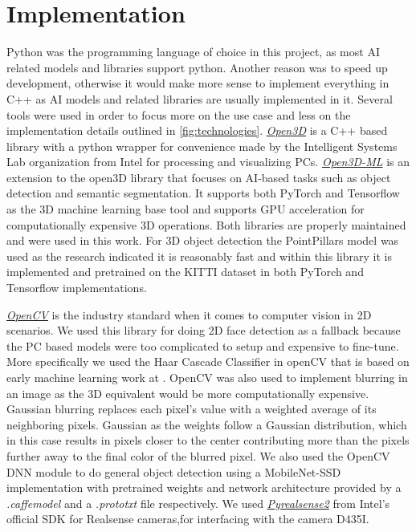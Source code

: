 \section{Implementation}
\label{sec:system:sec2}
Python was the programming language of choice in this project, as most AI related models and libraries
support python. Another reason was to speed up development, otherwise it would make more
sense to implement everything in C++ as AI models and related libraries are usually implemented in it.
Several tools were used in order to focus more on the use case and less on the implementation
details outlined in \ref{fig:technologies}.
\href{https://github.com/isl-org/Open3D}{\emph{Open3D}} is a C++ based library with a python wrapper for convenience made by the Intelligent Systems Lab organization from Intel for processing and visualizing \ac{PC}s.
\href{https://github.com/isl-org/Open3D-ML/}{\emph{Open3D-ML}} is an extension to the open3D library that focuses on AI-based tasks such as object detection and semantic segmentation.
It supports both PyTorch and Tensorflow as the 3D machine learning base tool and supports GPU acceleration for computationally expensive 3D operations.
Both libraries are properly maintained and were used in this work.
For 3D object detection the PointPillars model was used as the research indicated it is reasonably fast and within this library it is implemented and pretrained on the KITTI dataset in both PyTorch and Tensorflow implementations.

\href{https://opencv.org/}{\emph{OpenCV}} is the industry standard when it comes to computer vision in 2D scenarios. We used this library for doing 2D face detection as a fallback because the \ac{PC} based models were too complicated to setup and expensive to fine-tune. More specifically we used the Haar Cascade Classifier in openCV that is based on early machine learning work at \cite{Viola_Jones_2001}.
OpenCV was also used to implement blurring in an image as the 3D equivalent would be more computationally expensive.
Gaussian blurring replaces each pixel's value with a weighted average of its neighboring pixels.
Gaussian as the weights follow a Gaussian distribution, which in this case results in pixels closer to the center contributing more than the pixels further away to the final color of the blurred pixel.
We also used the OpenCV DNN module to do general object detection using a MobileNet-SSD implementation with pretrained weights and network architecture provided by a \emph{.caffemodel} and a \emph{.prototxt} file respectively.
We used \href{https://pypi.org/project/pyrealsense2/}{\emph{Pyrealsense2}} from Intel's official SDK for Realsense cameras,for interfacing with the camera D435I.

